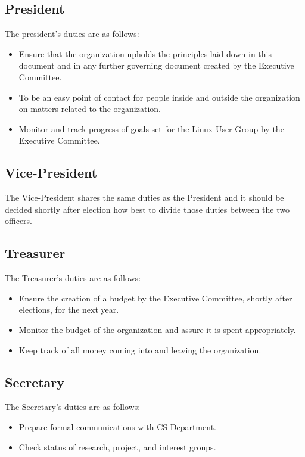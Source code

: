 \documentclass[letter]{report}
\begin{document}
\subsection{President}
The president's duties are as follows:
\begin{itemize}
	\item Ensure that the organization upholds the principles laid down in
		this document and in any further governing document created by
		the Executive Committee.
	\item To be an easy point of contact for people inside and outside the
		organization on matters related to the organization.
	\item Monitor and track progress of goals set for the Linux User Group
		by the Executive Committee.
\end{itemize}

\subsection{Vice-President}
The Vice-President shares the same duties as the President and it should be
decided shortly after election how best to divide those duties between the two
officers.

\subsection{Treasurer}
The Treasurer's duties are as follows:
\begin{itemize}
	\item Ensure the creation of a budget by the Executive Committee,
		shortly after elections, for the next year.
	\item Monitor the budget of the organization and assure it is spent
		appropriately.
	\item Keep track of all money coming into and leaving the organization.
\end{itemize}

\subsection{Secretary}
The Secretary's duties are as follows:
\begin{itemize}
	\item Prepare formal communications with CS Department.
	\item Check status of research, project, and interest groups.
\end{itemize}
\end{document}
